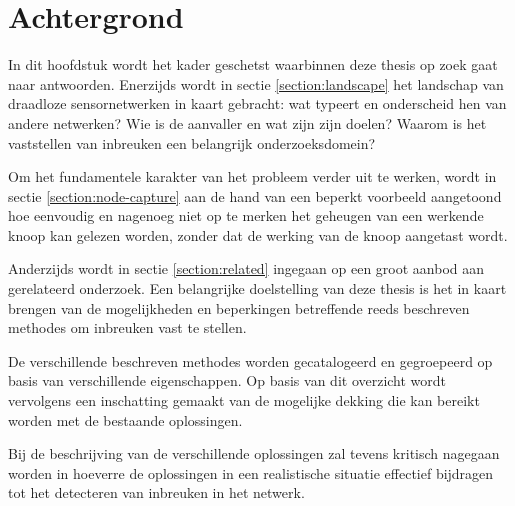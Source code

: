 \chapter{Achtergrond}
\label{chapter:achtergrond}

In dit hoofdstuk wordt het kader geschetst waarbinnen deze thesis op zoek gaat
naar antwoorden. Enerzijds wordt in sectie \ref{section:landscape} het
landschap van draadloze sensornetwerken in kaart gebracht: wat typeert en
onderscheid hen van andere netwerken? Wie is de aanvaller en wat zijn zijn
doelen? Waarom is het vaststellen van inbreuken een belangrijk onderzoeksdomein?

Om het fundamentele karakter van het probleem verder uit te werken, wordt in
sectie \ref{section:node-capture} aan de hand van een beperkt voorbeeld
aangetoond hoe eenvoudig en nagenoeg niet op te merken het geheugen van een
werkende knoop kan gelezen worden, zonder dat de werking van de knoop aangetast
wordt.

Anderzijds wordt in sectie \ref{section:related} ingegaan op een groot aanbod
aan gerelateerd onderzoek. Een belangrijke doelstelling van deze thesis is het
in kaart brengen van de mogelijkheden en beperkingen betreffende reeds
beschreven methodes om inbreuken vast te stellen.

De verschillende beschreven methodes worden gecatalogeerd en gegroepeerd op
basis van verschillende eigenschappen. Op basis van dit overzicht wordt
vervolgens een inschatting gemaakt van de mogelijke dekking die kan bereikt
worden met de bestaande oplossingen.

Bij de beschrijving van de verschillende oplossingen zal tevens kritisch
nagegaan worden in hoeverre de oplossingen in een realistische situatie
effectief bijdragen tot het detecteren van inbreuken in het netwerk.






